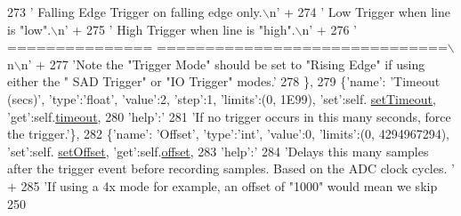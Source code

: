 \begin{DoxyCode}
{{{{273                             \textcolor{stringliteral}{'  Falling Edge    Trigger on falling edge only.\(\backslash\)n'} +
274                             \textcolor{stringliteral}{'  Low             Trigger when line is "low".\(\backslash\)n'} +
275                             \textcolor{stringliteral}{'  High            Trigger when line is "high".\(\backslash\)n'} +
276                             \textcolor{stringliteral}{'  =============== ==============================\(\backslash\)n\(\backslash\)n'} +
277                             \textcolor{stringliteral}{'Note the "Trigger Mode" should be set to "Rising Edge" if using either the "
      SAD Trigger" or "IO Trigger" modes.'}
278                             \},
279             \{\textcolor{stringliteral}{'name'}: \textcolor{stringliteral}{'Timeout (secs)'}, \textcolor{stringliteral}{'type'}:\textcolor{stringliteral}{'float'}, \textcolor{stringliteral}{'value'}:2, \textcolor{stringliteral}{'step'}:1, \textcolor{stringliteral}{'limits'}:(0, 1E99), \textcolor{stringliteral}{'set'}:self.
      \hyperlink{classsoftware_1_1chipwhisperer_1_1capture_1_1scopes_1_1__OpenADCInterface_1_1TriggerSettings_acba34f4d1ccaae7bcdab0f2903d98094}{setTimeout}, \textcolor{stringliteral}{'get'}:self.\hyperlink{classsoftware_1_1chipwhisperer_1_1capture_1_1scopes_1_1__OpenADCInterface_1_1TriggerSettings_a7036019925f52a88333c87f11c204308}{timeout},
280                      \textcolor{stringliteral}{'help'}:\textcolor{stringliteral}{'%
281                             \textcolor{stringliteral}{'If no trigger occurs in this many seconds, force the trigger.'}\},
282             \{\textcolor{stringliteral}{'name'}: \textcolor{stringliteral}{'Offset'}, \textcolor{stringliteral}{'type'}:\textcolor{stringliteral}{'int'}, \textcolor{stringliteral}{'value'}:0, \textcolor{stringliteral}{'limits'}:(0, 4294967294), \textcolor{stringliteral}{'set'}:self.
      \hyperlink{classsoftware_1_1chipwhisperer_1_1capture_1_1scopes_1_1__OpenADCInterface_1_1TriggerSettings_a5040d8fe1d4118f60144fcb0cd6451e5}{setOffset}, \textcolor{stringliteral}{'get'}:self.\hyperlink{classsoftware_1_1chipwhisperer_1_1capture_1_1scopes_1_1__OpenADCInterface_1_1TriggerSettings_a0212bec51282adeb7554b50f36be78ea}{offset},
283                      \textcolor{stringliteral}{'help'}:\textcolor{stringliteral}{'%
284                             \textcolor{stringliteral}{'Delays this many samples after the trigger event before recording samples.
       Based on the ADC clock cycles. '} +
285                             \textcolor{stringliteral}{'If using a 4x mode for example, an offset of "1000" would mean we skip 250
}}}}}}}
\end{DoxyCode}
